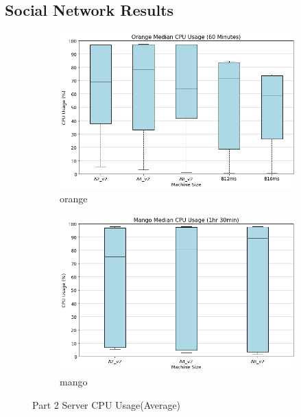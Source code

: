 \subsection{Social Network Results}
\begin{figure}[H]
     \centering
     \begin{subfigure}[b]{0.49\textwidth}
         \centering
         \includegraphics[width=\textwidth]{images/orange_cpu.png}
         \caption{orange}
         \label{fig:orange_cpu}
     \end{subfigure}
     \hfill
     \begin{subfigure}[b]{0.49\textwidth}
         \centering
         \includegraphics[width=\textwidth]{images/mango_cpu.png}
         \caption{mango}
         \label{fig:mango_cpu}
     \end{subfigure}
    
        \caption{Part 2 Server CPU Usage(Average)}
        \label{fig:part_2_cpu}
\end{figure}
